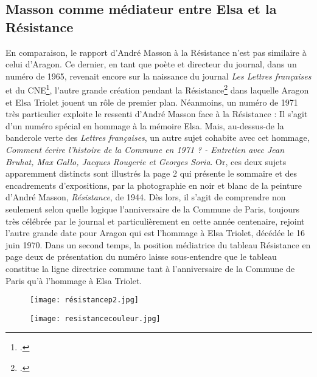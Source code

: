 \subsection{Masson comme médiateur entre Elsa et la Résistance}

En comparaison, le rapport d’André Masson à la Résistance n’est pas similaire à celui d’Aragon. Ce dernier, en tant que poète et  directeur du journal, dans un numéro de  1965,  revenait encore  sur la naissance du journal \emph{Les Lettres françaises} et du CNE\footcite{histoirecnetriolet}, l’autre grande création pendant la Résistance\footcite{specialelsa} dans laquelle Aragon et Elsa Triolet jouent un rôle de premier plan. Néanmoins, un numéro de 1971 très particulier exploite le ressenti d’André Masson face à la Résistance : Il s’agit d’un numéro spécial en hommage à la mémoire Elsa. Mais, au-dessus-de la banderole verte des \emph{Lettres françaises}, un autre sujet cohabite avec cet hommage, \emph{Comment écrire l’histoire de la Commune en 1971 ? - Entretien avec Jean Bruhat, Max Gallo, Jacques Rougerie et Georges Soria}. Or, ces deux sujets apparemment distincts sont illustrés la page 2 qui présente le sommaire et des encadrements d’expositions, par la photographie en noir et blanc de la peinture d’André Masson, \emph{Résistance}, de 1944. Dès lors, il s’agit de comprendre non seulement selon quelle logique l’anniversaire de la Commune de Paris, toujours très célébrée par le journal et particulièrement en cette année centenaire, rejoint l’autre grande date pour Aragon qui est l’hommage à Elsa Triolet, décédée le 16 juin 1970. Dans un second temps, la position médiatrice du tableau Résistance en page deux de présentation du numéro laisse sous-entendre que le tableau constitue la ligne directrice commune tant à l’anniversaire de la Commune de Paris qu’à l’hommage à Elsa Triolet. 


\begin{figure}[H]
   \centering
   \texttt{[image: résistancep2.jpg]}
	\caption{\cite{specialelsa}}\label{fig:Réssitance}
\end{figure}

\begin{figure}[H]
   \centering
   \texttt{[image: resistancecouleur.jpg]}
	\caption{\cite{specialelsa}}\label{fig:Réssitancecouleur}
\end{figure}



